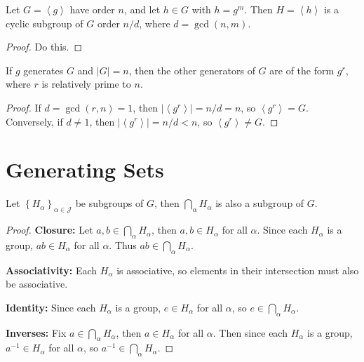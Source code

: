 \documentclass[10pt]{report}
\begin{document}
\begin{thrm}{}{}
	Let $G= \left\langle g \right\rangle$ have order $n$, and let $h \in G$ with $h = g^m$. Then $H = \left\langle h \right\rangle$ is a cyclic subgroup of $G$ order $n/d$, where $d = \gcd(n,m)$.
\end{thrm}
\begin{proof}
	{\color{red}Do this.}
\end{proof}

\begin{cor}
	If $g$ generates $G$ and $|G|=n$, then the other generators of $G$ are of the form $g^r$, where $r$ is relatively prime to $n$.
\end{cor}
\begin{proof}
	If $d = \gcd(r,n)=1$, then $|\left\langle g^r \right\rangle| = n/d = n$, so $\left\langle g^r \right\rangle=G$. Conversely, if $d \neq 1$, then $|\left\langle g^r \right\rangle| = n/d < n$, so $\left\langle g^r \right\rangle\neq G$.
\end{proof}


\section{Generating Sets}

\begin{prop}
	Let $\left\{ H_{\alpha} \right\}_{\alpha \in \mathcal{J}}$ be subgroups of $G$, then $\bigcap_{\alpha}H_{\alpha}$ is also a subgroup of $G$.
\end{prop}
\begin{proof}
	\textbf{Closure:} Let $a,b \in \bigcap_{\alpha}H_{\alpha}$, then $a,b \in H_{\alpha}$ for all $\alpha$. Since each $H_{\alpha}$ is a group, $ab \in H_{\alpha}$ for all $\alpha$. Thus $ab \in \bigcap_{\alpha}H_{\alpha}$.

	\textbf{Associativity:} Each $H_{\alpha}$ is associative, so elements in their intersection must also be associative.

	\textbf{Identity:} Since each $H_{\alpha}$ is a group, $e \in H_{\alpha}$ for all $\alpha$, so $e \in \bigcap_{\alpha}H_{\alpha}$.

	\textbf{Inverses:} Fix $a \in \bigcap_{\alpha}H_{\alpha}$, then $a \in H_{\alpha}$ for all $\alpha$. Then since each $H_{\alpha}$ is a group, $a^{-1} \in H_{\alpha}$ for all $\alpha$, so $a^{-1} \in \bigcap_{\alpha}H_{\alpha}$.
\end{proof}
\end{document}
